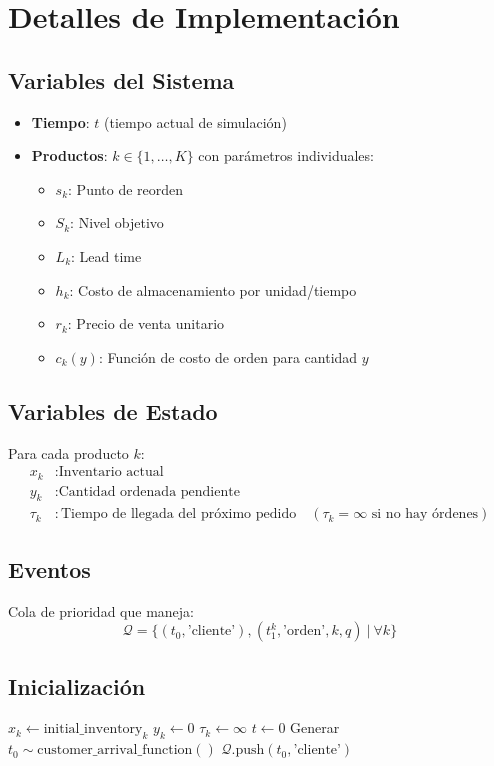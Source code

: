 \documentclass{report}
\begin{document}
\section{Detalles de Implementación}\label{S2}

\subsection{Variables del Sistema}
\begin{itemize}
    \item \textbf{Tiempo}: $t$ (tiempo actual de simulación)
    \item \textbf{Productos}: $k \in \{1,\ldots,K\}$ con parámetros individuales:
    \begin{itemize}
        \item $s_k$: Punto de reorden
        \item $S_k$: Nivel objetivo
        \item $L_k$: Lead time
        \item $h_k$: Costo de almacenamiento por unidad/tiempo
        \item $r_k$: Precio de venta unitario
        \item $c_k(y)$: Función de costo de orden para cantidad $y$
    \end{itemize}
\end{itemize}

\subsection{Variables de Estado}
Para cada producto $k$:
\begin{align*}
x_k &: \text{Inventario actual} \\
y_k &: \text{Cantidad ordenada pendiente} \\
\tau_k &: \text{Tiempo de llegada del próximo pedido} \quad (\tau_k = \infty \text{ si no hay órdenes})
\end{align*}

\subsection{Eventos}
Cola de prioridad que maneja:
\begin{equation*}
\mathcal{Q} = \{(t_0, \text{'cliente'}), (t_1^k, \text{'orden'}, k, q)\ |\ \forall k\}
\end{equation*}

\subsection{Inicialización}
\begin{algorithmic}[1]
    \State $x_k \gets \text{initial\_inventory}_k$
    \State $y_k \gets 0$
    \State $\tau_k \gets \infty$
\EndFor
\State $t \gets 0$
\State Generar $t_0 \sim \text{customer\_arrival\_function}()$
\State $\mathcal{Q}.\text{push}(t_0, \text{'cliente'})$
\end{algorithmic}
\end{document}
